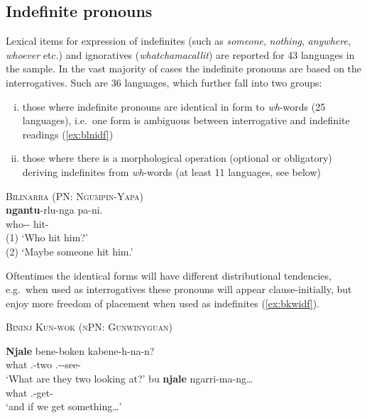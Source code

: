 \documentclass[12pt,egregdoesnotlikesansseriftitles]{scrartcl}
\begin{document}
\subsection{Indefinite pronouns}
\label{sec:indefs}
Lexical items for expression of indefinites (such as \textit{someone}, \textit{nothing}, \textit{anywhere}, \textit{whoever} etc.) and ignoratives (\textit{whatchamacallit}) are reported for 43 languages in the sample. In the vast majority of cases the indefinite pronouns are based on the interrogatives. Such are 36 languages, which further fall into two groups:
\begin{enumerate}[(i)]
\item those where indefinite pronouns are identical in form to \textit{wh}-words (25 languages), i.e.\ one form is ambiguous between interrogative and indefinite readings (\ref{ex:blnidf})
\item those where there is a morphological operation (optional or obligatory) deriving indefinites from \textit{wh}-words (at least 11 languages, see below)
\end{enumerate}
\begin{exe}
  \ex\label{ex:blnidf} \textsc{Bilinarra (PN: Ngumpin-Yapa)}\hfill {}\\
  \gll \textbf{ngantu}-rlu-nga pa-ni.\\
  who-\Erg-\Dub{} hit-\Pst{}\\
  \glt (1) `Who hit him?'\\
  (2) `Maybe someone hit him.'
\end{exe}

Oftentimes the identical forms will have different distributional tendencies, e.g.\ when used as interrogatives these pronouns will appear clause-initially, but enjoy more freedom of placement when used as indefinites (\ref{ex:bkwidf}).
\begin{exe}
  \ex\label{ex:bkwidf} \textsc{Bininj Kun-wok (nPN: Gunwinyguan)}\hfill {}\\
  \begin{xlist}
    \ex\gll \textbf{Njale} bene-boken kabene-h-na-n?\\
    what \Third.\Ua-two \Third.\Ua-\Imm-see-\Np\\
    `What are they two looking at?' %
    \ex\gll bu \textbf{njale} ngarri-ma-ng\ldots\\
    \Sub{} what \First.\Aug-get-\Np\\
    `and if we get something\ldots' %
  \end{xlist}
\end{exe}
\end{document}
